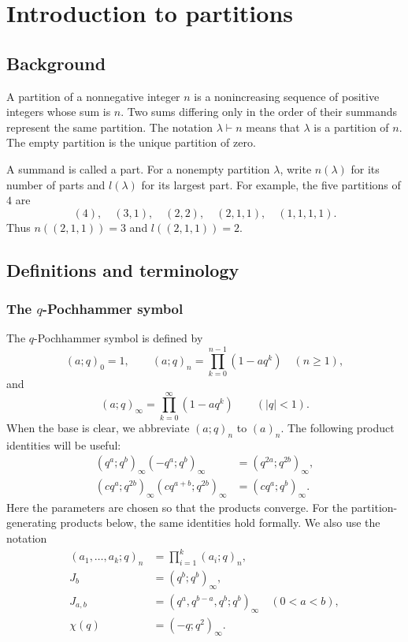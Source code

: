 \chapter{Introduction to partitions}
\section{Background}
A partition of a nonnegative integer $n$ is a nonincreasing sequence of
positive integers whose sum is $n$. Two sums differing only in the order
of their summands represent the same partition. The notation
$\lambda\vdash n$ means that $\lambda$ is a partition of $n$. The empty
partition is the unique partition of zero.

A summand is called a part. For a nonempty partition $\lambda$, write
$n(\lambda)$ for its number of parts and $l(\lambda)$ for its largest part.
For example, the five partitions of $4$ are
\[
 (4),\quad(3,1),\quad(2,2),\quad(2,1,1),\quad(1,1,1,1).
\]
Thus $n((2,1,1))=3$ and $l((2,1,1))=2$.

\section{Definitions and terminology}
\subsection{The \texorpdfstring{$q$}{q}-Pochhammer symbol}
The $q$-Pochhammer symbol is defined by
\[
 (a;q)_0=1,\qquad (a;q)_n=\prod_{k=0}^{n-1}(1-aq^k)\quad(n\ge1),
\]
and
\[
 (a;q)_\infty=\prod_{k=0}^\infty(1-aq^k)\qquad(|q|<1).
\]
When the base is clear, we abbreviate $(a;q)_n$ to $(a)_n$.
The following product identities will be useful:
\begin{align}
 (q^a;q^b)_\infty(-q^a;q^b)_\infty
 &= (q^{2a};q^{2b})_\infty,\label{eq:product-sign}\\
 (cq^a;q^{2b})_\infty(cq^{a+b};q^{2b})_\infty
 &= (cq^a;q^b)_\infty.\label{eq:product-split}
\end{align}
Here the parameters are chosen so that the products converge. For the
partition-generating products below, the same identities hold formally.
We also use the notation
\begin{align*}
 (a_1,\ldots,a_k;q)_n&=\prod_{i=1}^k(a_i;q)_n,\\
 J_b&=(q^b;q^b)_\infty,\\
 J_{a,b}&=(q^a,q^{b-a},q^b;q^b)_\infty\quad(0<a<b),\\
 \chi(q)&=(-q;q^2)_\infty.
\end{align*}


